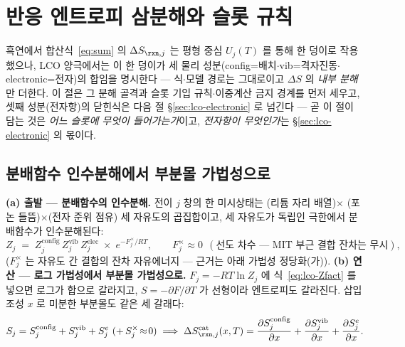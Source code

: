 \section{반응 엔트로피 삼분해와 슬롯 규칙}\label{sec:lco-decomp}
흑연에서 합산식~\eqref{eq:sum} 의 $\Delta S_{\rxn,j}$ 는 평형 중심 $U_j(T)$ 를 통해 한 덩이로 작용했으나, LCO 양극에서는 이 한 덩이가 세 물리 성분(config=배치$\cdot$vib=격자진동$\cdot$electronic=전자)의 합임을 명시한다 --- 식$\cdot$모델 경로는 그대로이고 $\Delta S$ 의 \emph{내부 분해}만 더한다. 이 절은 그 분해 골격과 슬롯 기입 규칙$\cdot$이중계산 금지 경계를 먼저 세우고, 셋째 성분(전자항)의 닫힌식은 다음 절 \S\ref{sec:lco-electronic} 로 넘긴다 --- 곧 이 절이 담는 것은 \emph{어느 슬롯에 무엇이 들어가는가}이고, \emph{전자항이 무엇인가}는 \S\ref{sec:lco-electronic} 의 몫이다.

\subsection{분배함수 인수분해에서 부분몰 가법성으로}\label{sec:lco-decomp-add}
\textbf{(a) 출발 --- 분배함수의 인수분해.} 전이 $j$ 창의 한 미시상태는 (리튬 자리 배열)$\times$
(포논 들뜸)$\times$(전자 준위 점유) 세 자유도의 곱집합이고, 세 자유도가 독립인 극한에서 분배함수가
인수분해된다:
\begin{equation}
Z_j\;=\;Z_j^\mathrm{config}\,Z_j^\mathrm{vib}\,Z_j^\mathrm{elec}\;\times\;e^{-F_j^{\times}/RT},
\qquad F_j^{\times}\approx0\ \ (\text{선도 차수 --- MIT 부근 결합 잔차는 무시}),
\label{eq:lco-Zfact}
\end{equation}
($F_j^{\times}$ 는 자유도 간 결합의 잔차 자유에너지 --- 근거는 아래 가법성 정당화(가)). \textbf{(b) 연산 --- 로그
가법성에서 부분몰 가법성으로.} $F_j=-RT\ln Z_j$ 에 식~\eqref{eq:lco-Zfact} 를 넣으면 로그가 합으로
갈라지고, $S=-\partial F/\partial T$ 가 선형이라 엔트로피도 갈라진다. 삽입 조성 $x$ 로 미분한 부분몰도
같은 세 갈래다:
\begin{equation}
S_j=S_j^\mathrm{config}+S_j^\mathrm{vib}+S_j^{e}\ (+\,S_j^{\times}\!\approx\!0)
\;\Longrightarrow\;
\Delta S_{\rxn,j}^\mathrm{cat}(x,T)=\frac{\partial S_j^\mathrm{config}}{\partial x}
+\frac{\partial S_j^\mathrm{vib}}{\partial x}
+\frac{\partial S_j^{e}}{\partial x}.
\label{eq:lco-Sadd}
\end{equation}

